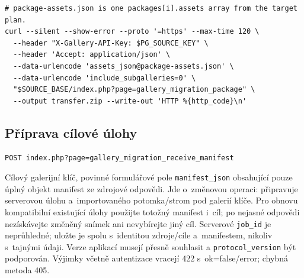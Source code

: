 \documentclass[11pt,a4paper]{article}
\newcommand{\codeword}[1]{\nolinkurl{#1}}
\begin{document}
\begin{lstlisting}[language={}]
# package-assets.json is one packages[i].assets array from the target plan.
curl --silent --show-error --proto '=https' --max-time 120 \
  --header "X-Gallery-API-Key: $PG_SOURCE_KEY" \
  --header 'Accept: application/json' \
  --data-urlencode 'assets_json@package-assets.json' \
  --data-urlencode 'include_subgalleries=0' \
  "$SOURCE_BASE/index.php?page=gallery_migration_package" \
  --output transfer.zip --write-out 'HTTP %{http_code}\n'
\end{lstlisting}

\subsection{\texorpdfstring{Příprava cílové úlohy}{Příprava cílové úlohy}}

\label{api352:migration-receive-manifest}

\begin{lstlisting}[language={}]
POST index.php?page=gallery_migration_receive_manifest
\end{lstlisting}

Cílový galerijní klíč, povinné formulářové pole \codeword{manifest_json} obsahující pouze
úplný objekt manifest ze zdrojové odpovědi. Jde o~změnovou operaci: připravuje serverovou
úlohu a~importovaného potomka/strom pod galerií klíče. Pro obnovu kompatibilní existující
úlohy použijte totožný manifest i~cíl; po nejasné odpovědi nezískávejte změněný snímek ani
nevybírejte jiný cíl. Serverové \codeword{job_id} je neprůhledné; uložte je spolu
s~identitou zdroje/cíle a~manifestem, nikoliv s~tajnými údaji. Verze aplikací musejí přesně
souhlasit a \codeword{protocol_version} být podporován. Výjimky včetně autentizace vracejí
422 s~ok=false/error; chybná metoda 405.
\end{document}

